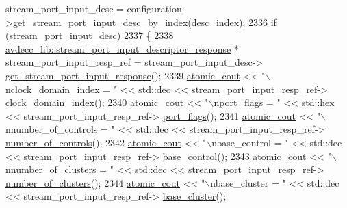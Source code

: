 \begin{DoxyCode}
      stream\_port\_input\_desc = configuration->\hyperlink{classavdecc__lib_1_1configuration__descriptor_ad05646251e84a4024f317dd82395b8f7}{get\_stream\_port\_input\_desc\_by\_index}(desc\_index);
2336         \textcolor{keywordflow}{if} (stream\_port\_input\_desc)
2337         \{
2338             \hyperlink{classavdecc__lib_1_1stream__port__input__descriptor__response}{avdecc\_lib::stream\_port\_input\_descriptor\_response}
       * stream\_port\_input\_resp\_ref = stream\_port\_input\_desc->
      \hyperlink{classavdecc__lib_1_1stream__port__input__descriptor_af310caba5e55b84e2c04cf5c2dfb77f6}{get\_stream\_port\_input\_response}();
2339             \hyperlink{cmd__line_8h_a0bc38ccc65c79ba06c6fcd7b4bf554c3}{atomic\_cout} << \textcolor{stringliteral}{"\(\backslash\)nclock\_domain\_index = "} << std::dec << stream\_port\_input\_resp\_ref->
      \hyperlink{classavdecc__lib_1_1stream__port__input__descriptor__response_aab7f93d403d8b73f8f4a8fb7c61ecded}{clock\_domain\_index}();
2340             \hyperlink{cmd__line_8h_a0bc38ccc65c79ba06c6fcd7b4bf554c3}{atomic\_cout} << \textcolor{stringliteral}{"\(\backslash\)nport\_flags = "} << std::hex << stream\_port\_input\_resp\_ref->
      \hyperlink{classavdecc__lib_1_1stream__port__input__descriptor__response_a66bad2f1317cba04f0ea271f7181b58f}{port\_flags}();
2341             \hyperlink{cmd__line_8h_a0bc38ccc65c79ba06c6fcd7b4bf554c3}{atomic\_cout} << \textcolor{stringliteral}{"\(\backslash\)nnumber\_of\_controls = "} << std::dec << stream\_port\_input\_resp\_ref->
      \hyperlink{classavdecc__lib_1_1stream__port__input__descriptor__response_a5accf7abc7d231a0767ad5cac68b8b39}{number\_of\_controls}();
2342             \hyperlink{cmd__line_8h_a0bc38ccc65c79ba06c6fcd7b4bf554c3}{atomic\_cout} << \textcolor{stringliteral}{"\(\backslash\)nbase\_control = "} << std::dec << stream\_port\_input\_resp\_ref->
      \hyperlink{classavdecc__lib_1_1stream__port__input__descriptor__response_ac1f5297533142234c764e84c01ce5a16}{base\_control}();
2343             \hyperlink{cmd__line_8h_a0bc38ccc65c79ba06c6fcd7b4bf554c3}{atomic\_cout} << \textcolor{stringliteral}{"\(\backslash\)nnumber\_of\_clusters = "} << std::dec << stream\_port\_input\_resp\_ref->
      \hyperlink{classavdecc__lib_1_1stream__port__input__descriptor__response_a2ea8849b4f2d61dd26ed53e94316e93e}{number\_of\_clusters}();
2344             \hyperlink{cmd__line_8h_a0bc38ccc65c79ba06c6fcd7b4bf554c3}{atomic\_cout} << \textcolor{stringliteral}{"\(\backslash\)nbase\_cluster = "} << std::dec << stream\_port\_input\_resp\_ref->
      \hyperlink{classavdecc__lib_1_1stream__port__input__descriptor__response_aa87ccba6a00a404146e569e70185d839}{base\_cluster}();

\end{DoxyCode}
